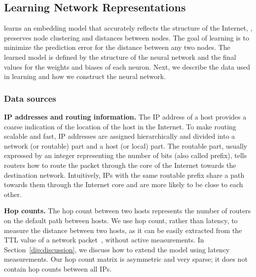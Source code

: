 \subsection{Learning Network Representations}
\label{dip:design}



\system{} learns an embedding model that accurately reflects the structure of the Internet, \ie{}, preserves node clustering and distances between nodes. The goal of learning is to minimize the prediction error for the distance between any two nodes. The learned model is defined by the structure of the neural network and the final values for the weights and biases of each neuron. Next, we describe the data used in learning and how we construct the neural network.

\subsubsection{Data sources} 


\textbf{IP addresses and routing information.}
The IP address of a host provides a coarse indication of the location of the host in the Internet. To make routing scalable and fast, IP addresses are assigned hierarchically and divided into a  network (or routable) part and a host (or local) part. 
The routable part, usually expressed by an integer representing the number of bits (also called prefix), tells routers how to route the packet through the core of the Internet towards the destination network. Intuitively, IPs with the same routable prefix share a path towards them through the Internet core and are more likely to be close to each other.

\textbf{Hop counts.} The hop count between two hosts represents the number of routers on the default path between hosts. We use hop count, rather than latency, to measure the distance between two hosts, as it can be easily extracted from the TTL value of a network packet~\citep{hc-filter}, without active measurements. In Section~\ref{dip:discussion}, we discuss how to extend the model using latency measurements. Our hop count matrix is asymmetric and very sparse; it does not contain hop counts between all IPs. %



